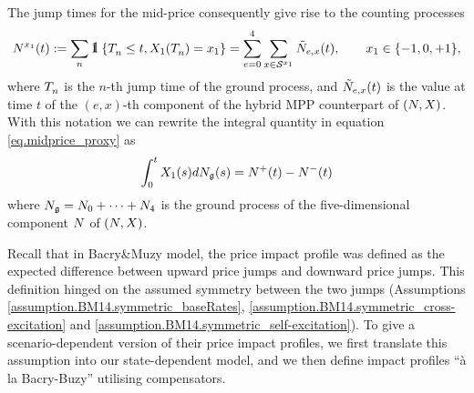 \documentclass[10pt, article,table]{article}
\begin{document}
The jump times for the mid-price consequently give rise to the counting processes 
\begin{equation}\label{eq.jump_times}
 \countingProc[]^{x_{1}}(t) := \sum_{n}\one\left\lbrace \arrivalTimes[]_n\leq t , \stateVariable_1(\arrivalTimes[]_n) = x_1 \right\rbrace
 =
 \sum_{e=0}^{4} \sum_{x\in\stateSpace^{x_1}} \hybridHawkes_{e,x}(t),
 \qquad x_1 \in \lbrace-1,0,+1\rbrace,
\end{equation}
where $\arrivalTimes[]_n$ is the $n$-th jump time of the ground process, and $\hybridHawkes_{e,x}(t)$ is the value at time $t$ of the $(e,x)$-th component of the hybrid MPP counterpart of $(\multiCountingProc,\stateVariable)$.
With this notation we can rewrite the integral quantity in equation \eqref{eq.midprice_proxy} as 
\begin{equation*}
 \intzerot \stateVariable_1 (s)d\groundProc(s)
 =
 \countingProc[]^{+}(t) - \countingProc[]^{-}(t)
\end{equation*}
where $\groundProc = \countingProc[0] + \dots + \countingProc[4]$ is the ground process of the five-dimensional component $\multiCountingProc$ of $(\multiCountingProc,\stateVariable)$.

Recall that in Bacry\&Muzy model, the price impact profile was defined as the expected difference between upward price jumps and downward price jumps. This definition hinged on the assumed symmetry between the two jumps (Assumptions \ref{assumption.BM14.symmetric_baseRates}, \ref{assumption.BM14.symmetric_cross-excitation} and \ref{assumption.BM14.symmetric_self-excitation}). To give a scenario-dependent version of their price impact profiles, we first translate this assumption into our state-dependent model, and we then define impact profiles ``\`a la Bacry-Buzy'' utilising compensators. 
\end{document}
